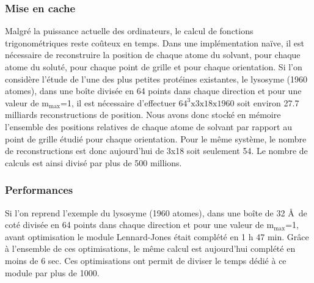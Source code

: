 \subsubsection{Mise en cache}
Malgré la puissance actuelle des ordinateurs, le calcul de fonctions trigonométriques reste coûteux en temps. Dans une implémentation naïve, il est nécessaire de reconstruire la position de chaque atome du solvant, pour chaque atome du soluté, pour chaque point de grille et pour chaque orientation. Si l'on considère l'étude de l'une des plus petites protéines existantes, le lysosyme (1960 atomes), dans une boîte divisée en 64 points dans chaque direction et pour une valeur de $\mathrm{m}_\mathrm{max}$=1, il est nécessaire d'effectuer $64^3\mathrm{x}3\mathrm{x}18\mathrm{x}1960$ soit environ 27.7 milliards reconstructions de position. Nous avons donc stocké en mémoire l'ensemble des positions relatives de chaque atome de solvant par rapport au point de grille étudié pour chaque orientation. Pour le même système, le nombre de reconstructions est donc aujourd'hui de 3x18 soit seulement 54. Le nombre de calculs est ainsi divisé par plus de 500 millions.


\subsubsection{Performances}
Si l'on reprend l'exemple du lysosyme (1960 atomes), dans une boîte de 32 \AA\ de coté divisée en 64 points dans chaque direction et pour une valeur de $\mathrm{m}_\mathrm{max}$=1, avant optimisation le module Lennard-Jones était complété en 1 h 47 min. Grâce à l'ensemble de ces optimisations, le même calcul est aujourd'hui complété en moins de 6 sec. Ces optimisations ont permit de diviser le temps dédié à ce module par plus de 1000.

%

%








